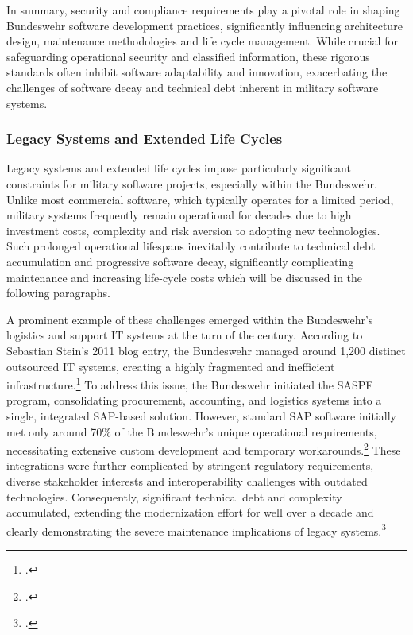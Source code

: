 In summary, security and compliance requirements play a pivotal role in shaping Bundeswehr software development practices, significantly influencing architecture design, 
maintenance methodologies and life cycle management. While crucial for safeguarding operational security and classified information, these rigorous standards often inhibit software adaptability and innovation, exacerbating the challenges of software decay and technical debt inherent in military software systems.

\subsubsection{Legacy Systems and Extended Life Cycles}
Legacy systems and extended life cycles impose particularly significant constraints for military software projects, especially within the Bundeswehr. 
Unlike most commercial software, which typically operates for a limited period, military systems frequently remain operational for decades due to high investment costs, complexity and risk aversion to adopting new technologies. Such prolonged operational 
lifespans inevitably contribute to technical debt accumulation and progressive software decay, significantly complicating maintenance and increasing life-cycle costs which will be discussed in the following paragraphs.

A prominent example of these challenges emerged within the Bundeswehr's logistics and support IT systems at the turn of the century. According to Sebastian Stein's 2011 blog entry,
the Bundeswehr managed around 1,200 distinct outsourced IT systems, creating a highly fragmented and inefficient infrastructure.\footcite[no page number]{steinBusinessProcessManagement2011} To address this issue, the Bundeswehr initiated the \ac{SASPF} program, consolidating procurement, accounting, 
and logistics systems into a single, integrated SAP-based solution. However, standard SAP software initially met only around 70\% of the Bundeswehr's unique operational requirements, necessitating extensive custom development and temporary workarounds.\footcite[no page number]{steinBusinessProcessManagement2011} These integrations were further 
complicated by stringent regulatory requirements, diverse stakeholder interests and interoperability challenges with outdated technologies. Consequently, significant technical debt and complexity accumulated, extending the modernization effort for well over a decade and clearly demonstrating the severe maintenance implications of legacy systems.\footcite[no page number]{steinBusinessProcessManagement2011}

